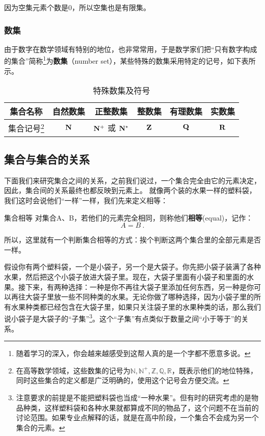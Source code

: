 因为空集元素个数是0，所以空集也是有限集。

\subsubsection{数集}

由于数字在数学领域有特别的地位，也非常常用，于是数学家们把“只有数字构成的集合”简称\footnote{随着学习的深入，你会越来越感受到这帮人真的是一个字都不愿意多说。}为\textbf{数集}（number set），某些特殊的数集采用特定的记号，如下表所示。

\begin{table}[ht]
\centering
\caption{特殊数集及符号}\label{tab_HsSet2}
\begin{tabular}{|c|c|c|c|c|c|}
\hline
集合名称 &自然数集  &正整数集  & 整数集 & 有理数集& 实数集 \\
\hline
集合记号\footnote{在高等数学领域，这些数集的记号为$\mathbb{N,N^+,Z,Q,R}$，既表示他们的地位特殊，同时这些集合的定义都是广泛明确的，使用这个记号会方便交流。} & ${\rm \mathbf{N}}$ & ${\rm \mathbf{N^+}}$ 或 ${\rm \mathbf{N^*}}$ & ${\rm \mathbf{Z}}$ & ${\rm \mathbf{Q}}$ & ${\rm \mathbf{R}}$ \\
\hline
\end{tabular}
\end{table}

\subsection{集合与集合的关系}\label{sub_HsSet_1}
下面我们来研究集合之间的关系，之前我们说过，一个集合完全由它的元素决定，因此，集合间的关系最终也都反映到元素上。
就像两个装的水果一样的塑料袋，我们这时会说他们“一样”一样，我们先来定义相等：
\begin{definition}{集合相等}
对集合A、B，若他们的元素完全相同，则称他们\textbf{相等}(equal)，记作：
\begin{equation}
A=B~.
\end{equation}
\end{definition}

所以，这里就有一个判断集合相等的方式：挨个判断这两个集合里的全部元素是否一样。

假设你有两个塑料袋，一个是小袋子，另一个是大袋子。你先把小袋子装满了各种水果，然后把这个小袋子放进大袋子里。现在，大袋子里面有小袋子和里面的水果。接下来，有两种选择：一种是你不再往大袋子里添加任何东西，另一种是你可以再往大袋子里放一些不同种类的水果。无论你做了哪种选择，因为小袋子里的所有水果种类都已经包含在大袋子里，如果只关注袋子里的水果种类的话，那么我们说小袋子是大袋子的“子集”\footnote{注意要求的前提是不能把塑料袋也当成“一种水果”。但有时的研究考虑的是物品种类，这样塑料袋和各种水果就都算成不同的物品了，这个问题不在当前的讨论范围。如果专业点解释的话，就是在高中阶段，一个集合不会成为另一个集合的元素。}。这个“子集”有点类似于数量之间“小于等于”的关系。

